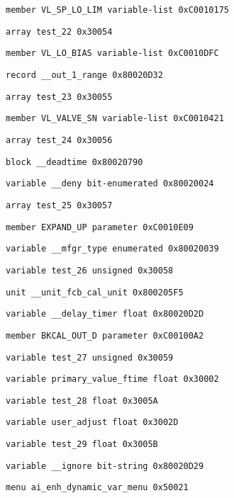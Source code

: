 {\tt member          VL\_SP\_LO\_LIM              variable-list   0xC0010175 }

{\tt array           test\_22                                   0x30054 }

{\tt member          VL\_LO\_BIAS                variable-list   0xC0010DFC }

{\tt record          \_\_out\_1\_range                             0x80020D32 }

{\tt array           test\_23                                   0x30055 }

{\tt member          VL\_VALVE\_SN               variable-list   0xC0010421 }

{\tt array           test\_24                                   0x30056 }

{\tt block           \_\_deadtime                                0x80020790 }

{\tt variable        \_\_deny                    bit-enumerated  0x80020024 }

{\tt array           test\_25                                   0x30057 }

{\tt member          EXPAND\_UP                 parameter       0xC0010E09 }

{\tt variable        \_\_mfgr\_type               enumerated      0x80020039 }

{\tt variable        test\_26                   unsigned        0x30058 }

{\tt unit            \_\_unit\_fcb\_cal\_unit                       0x800205F5 }

{\tt variable        \_\_delay\_timer             float           0x80020D2D }

{\tt member          BKCAL\_OUT\_D               parameter       0xC00100A2 }

{\tt variable        test\_27                   unsigned        0x30059 }

{\tt variable        primary\_value\_ftime       float           0x30002 }

{\tt variable        test\_28                   float           0x3005A }

{\tt variable        user\_adjust               float           0x3002D }

{\tt variable        test\_29                   float           0x3005B }

{\tt variable        \_\_ignore                  bit-string      0x80020D29 }

{\tt menu            ai\_enh\_dynamic\_var\_menu                   0x50021 }

